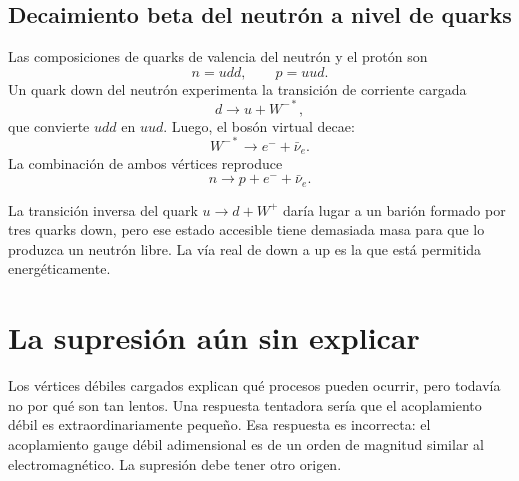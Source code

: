 \subsection{Decaimiento beta del neutrón a nivel de quarks}

Las composiciones de quarks de valencia del neutrón y el protón son
\begin{equation}
n=udd,
\qquad
p=uud.
\end{equation}
Un quark down del neutrón experimenta la transición de corriente cargada
\begin{equation}
d\longrightarrow u+W^{-*},
\end{equation}
que convierte \(udd\) en \(uud\). Luego, el bosón virtual decae:
\begin{equation}
W^{-*}\longrightarrow e^-+\bar\nu_e.
\end{equation}
La combinación de ambos vértices reproduce
\begin{equation}
n\longrightarrow p+e^-+\bar\nu_e.
\end{equation}

La transición inversa del quark \(u\to d+W^+\) daría lugar a un barión formado por tres quarks down, pero ese estado accesible tiene demasiada masa para que lo produzca un neutrón libre. La vía real de down a up es la que está permitida energéticamente.

\begin{classroomqa}
\end{classroomqa}

\section{La supresión aún sin explicar}

Los vértices débiles cargados explican qué procesos pueden ocurrir, pero todavía no por qué son tan lentos. Una respuesta tentadora sería que el acoplamiento débil es extraordinariamente pequeño. Esa respuesta es incorrecta: el acoplamiento gauge débil adimensional es de un orden de magnitud similar al electromagnético. La supresión debe tener otro origen.

